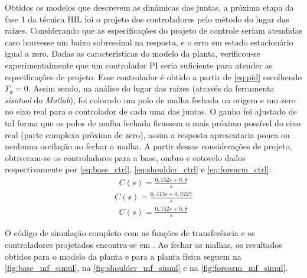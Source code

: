 Obtidos os modelos que descrevem as dinâmicas das juntas, a próxima etapa da fase 1 da técnica HIL foi o projeto dos 
controladores pelo método do lugar das raízes. Considerando que as especificações do projeto
de controle seriam atendidas caso houvesse um baixo sobressinal na resposta, e o erro em estado
estacionário igual a
zero. Dadas as características do modelo da planta, verificou-se experimentalmente que um controlador
PI seria suficiente para atender as especificações de projeto. Esse controlador é obtido a partir
de \eqref{eq:pid} escolhendo $T_d=0$.
Assim sendo, na análise do lugar das raízes (através da ferramenta \textit{sisotool} do \textit{Matlab}), foi colocado um polo de malha
fechada na origem e um zero no eixo real para o controlador de cada uma das juntas. O ganho foi 
ajustado de tal forma que os polos de malha fechada ficassem o mais próximo possível do eixo real (parte complexa próxima de zero), 
assim a resposta apresentaria pouca ou nenhuma oscilação ao fechar a malha. A partir dessas considerações de projeto, 
obtiveram-se os controladores para a base, ombro e cotovelo dados respectivamente por \eqref{eq:base_ctrl}, \eqref{eq:shoulder_ctrl}
e \eqref{eq:forearm_ctrl}:
\begin{equation}
  \begin{gathered}
    C(s) = \frac{0,152s + 0,8}{s}
  \end{gathered}
  \label{eq:base_ctrl}
\end{equation}
\begin{equation}
  \begin{gathered}
    C(s) = \frac{0,413 s + 0,9229}{s}
  \end{gathered}
  \label{eq:shoulder_ctrl}
\end{equation}
\begin{equation}
  \begin{gathered}
   C(s) = \frac{0,152s + 0,8}{s}
  \end{gathered}
  \label{eq:forearm_ctrl}
\end{equation}

O código de simulação completo com as funções de transferência e os controladores projetados encontra-se em \cite{lelis_hil1}.
Ao fechar as malhas, os resultados obtidos para o modelo da planta e para a planta física seguem na 
\autoref{fig:base_mf_simul}, na \autoref{fig:shoulder_mf_simul} e na \autoref{fig:forearm_mf_simul}.

